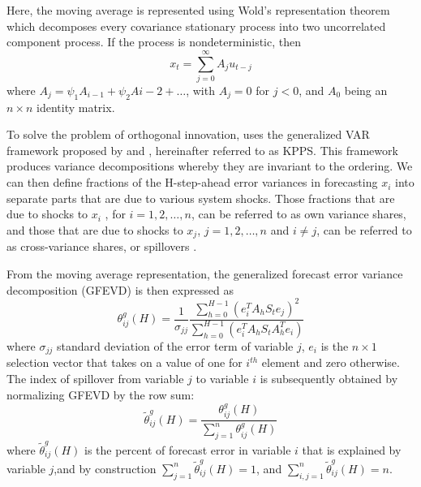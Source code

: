 \documentclass[preprint, 3p,
authoryear]{elsarticle} %
\begin{document}
Here, the moving average is represented using Wold's representation
theorem\citep{wold_study_1939, wold_study_1954} which decomposes every
covariance stationary process into two uncorrelated component process.
If the process is nondeterministic, then \begin{equation}
x_t = \sum_{j=0}^\infty A_ju_{t-j}
\end{equation} where \(A_j = \psi_1A_{i-1}+\psi_2A{i-2}+\dots\), with
\(A_j=0\) for \(j<0\), and \(A_0\) being an \(n \times n\) identity
matrix.

To solve the problem of orthogonal innovation,
\citet{diebold_better_2012} uses the generalized VAR framework proposed
by \citet{koop_impulse_1996} and \citet{pesaran_generalized_1998},
hereinafter referred to as KPPS. This framework produces variance
decompositions whereby they are invariant to the ordering. We can then
define fractions of the H-step-ahead error variances in forecasting
\(x_i\) into separate parts that are due to various system shocks. Those
fractions that are due to shocks to \(x_i\) , for \(i=1,2,\dots,n\), can
be referred to as own variance shares, and those that are due to shocks
to \(x_j\), \(j=1,2,\dots,n\) and \(i\neq j\), can be referred to as
cross-variance shares, or spillovers
\citep{diebold_better_2012, yang_idiosyncratic_2022, tan_how_2020, susilo_covid-19_2022}.

From the moving average representation, the generalized forecast error
variance decomposition (GFEVD) is then expressed as \begin{equation}
\theta_{ij}^g(H) = \frac{1}{\sigma_{jj}} \frac{\displaystyle\sum_{h=0}^{H-1}(e_i^TA_hS_te_j)^2}{\displaystyle\sum_{h=0}^{H-1}(e_i^TA_hS_tA_h^Te_i)}
\end{equation} where \(\sigma_{jj}\) standard deviation of the error
term of variable \(j\), \(e_i\) is the \(n \times 1\) selection vector
that takes on a value of one for \(i^{th}\) element and zero otherwise.
The index of spillover from variable \(j\) to variable \(i\) is
subsequently obtained by normalizing GFEVD by the row sum:
\begin{equation}
\tilde{\theta}_{ij}^g(H) = \frac{\theta_{ij}^g(H)}{\displaystyle\sum_{j=1}^n\theta_{ij}^g(H)}
\end{equation} where \(\tilde{\theta}_{ij}^g(H)\) is the percent of
forecast error in variable \(i\) that is explained by variable \(j\),and
by construction \(\sum_{j=1}^n\tilde{\theta}_{ij}^g(H) = 1\), and
\(\sum_{i,j=1}^n\tilde{\theta}_{ij}^g(H) = n\).
\end{document}
